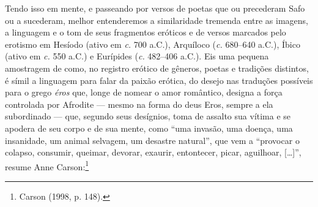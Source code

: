 Tendo isso em mente, e passeando por versos de poetas que ou precederam Safo ou
a sucederam, melhor entenderemos a similaridade tremenda entre as imagens, a
linguagem e o tom de seus fragmentos eróticos e de versos marcados pelo
erotismo em Hesíodo (ativo em \textit{c.} 700 a.C.), Arquíloco (\textit{c.} 680--640
a.C.), Íbico (ativo em \textit{c.} 550 a.C.) e Eurípides (\textit{c.} 482--406 a.C.). Eis
uma pequena amostragem de como, no registro erótico de gêneros, poetas e
tradições distintos, é símil a linguagem para falar da paixão erótica, do
desejo nas traduções possíveis para o grego \textit{éros} que, longe de nomear
o amor romântico, designa a força controlada por Afrodite --- mesmo na forma do
deus Eros, sempre a ela subordinado --- que, segundo seus desígnios, toma de
assalto sua vítima e se apodera de seu corpo e de sua mente, como “uma invasão,
uma doença, uma insanidade, um animal selvagem, um desastre natural”, que vem a
“provocar o colapso, consumir, queimar, devorar, exaurir, entontecer, picar,
aguilhoar, [\ldots{}]”, resume Anne Carson:\footnote{ Carson (1998, p. 148).}

